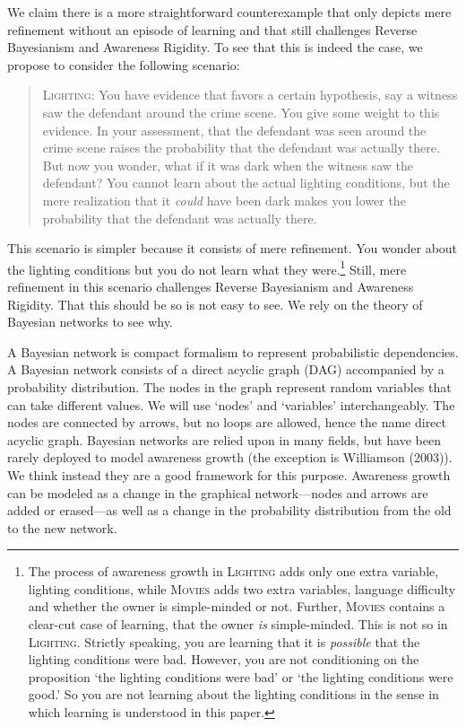 \documentclass[
  11pt,
  dvipsnames,enabledeprecatedfontcommands]{scrartcl}
\begin{document}
\label{sec:better}

We claim there is a more straightforward counterexample that only
depicts mere refinement without an episode of learning and that still
challenges Reverse Bayesianism and Awareness Rigidity. To see that this
is indeed the case, we propose to consider the following scenario:

\begin{quote}
\textsc{Lighting:} You have evidence that favors a certain hypothesis,
say a witness saw the defendant around the crime scene. You give some
weight to this evidence. In your assessment, that the defendant was seen
around the crime scene raises the probability that the defendant was
actually there. But now you wonder, what if it was dark when the witness
saw the defendant? You cannot learn about the actual lighting
conditions, but the mere realization that it \textit{could} have been
dark makes you lower the probability that the defendant was actually
there.
\end{quote}

\doublespace

\noindent This scenario is simpler because it consists of mere
refinement. You wonder about the lighting conditions but you do not
learn what they were.\footnote{The process of awareness growth in
  \textsc{Lighting} adds only one extra variable, lighting conditions,
  while \textsc{Movies} adds two extra variables, language difficulty
  and whether the owner is simple-minded or not. Further,
  \textsc{Movies} contains a clear-cut case of learning, that the owner
  \emph{is} simple-minded. This is not so in \textsc{Lighting}. Strictly
  speaking, you are learning that it is \emph{possible} that the
  lighting conditions were bad. However, you are not conditioning on the
  proposition `the lighting conditions were bad' or `the lighting
  conditions were good.' So you are not learning about the lighting
  conditions in the sense in which learning is understood in this paper.}
Still, mere refinement in this scenario challenges Reverse Bayesianism
and Awareness Rigidity. That this should be so is not easy to see. We
rely on the theory of Bayesian networks to see why.

A Bayesian network is compact formalism to represent probabilistic
dependencies. A Bayesian network consists of a direct acyclic graph
(DAG) accompanied by a probability distribution. The nodes in the graph
represent random variables that can take different values. We will use
`nodes' and `variables' interchangeably. The nodes are connected by
arrows, but no loops are allowed, hence the name direct acyclic graph.
Bayesian networks are relied upon in many fields, but have been rarely
deployed to model awareness growth (the exception is Williamson (2003)).
We think instead they are a good framework for this purpose. Awareness
growth can be modeled as a change in the graphical network---nodes and
arrows are added or erased---as well as a change in the probability
distribution from the old to the new network.
\end{document}
